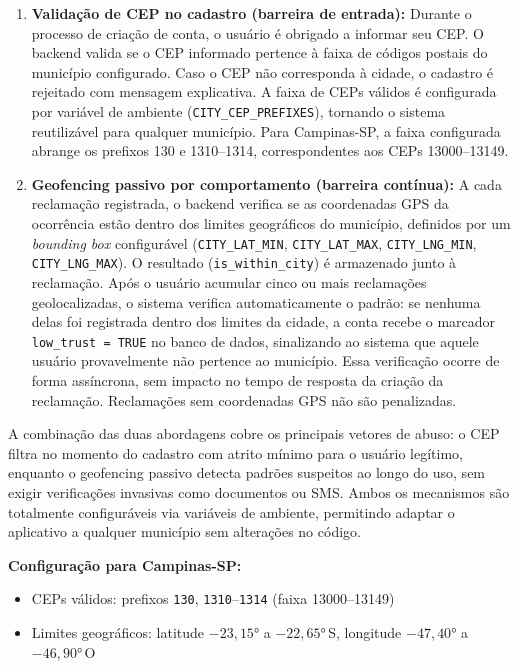 \begin{enumerate}
  \item \textbf{Validação de CEP no cadastro (barreira de entrada):}
        Durante o processo de criação de conta, o usuário é obrigado a informar
        seu CEP. O backend valida se o CEP informado pertence à faixa de códigos
        postais do município configurado. Caso o CEP não corresponda à cidade,
        o cadastro é rejeitado com mensagem explicativa. A faixa de CEPs válidos
        é configurada por variável de ambiente (\texttt{CITY\_CEP\_PREFIXES}),
        tornando o sistema reutilizável para qualquer município. Para
        Campinas-SP, a faixa configurada abrange os prefixos 130 e 1310--1314,
        correspondentes aos CEPs 13000--13149.

  \item \textbf{Geofencing passivo por comportamento (barreira contínua):}
        A cada reclamação registrada, o backend verifica se as coordenadas
        GPS da ocorrência estão dentro dos limites geográficos do município,
        definidos por um \textit{bounding box} configurável
        (\texttt{CITY\_LAT\_MIN}, \texttt{CITY\_LAT\_MAX},
        \texttt{CITY\_LNG\_MIN}, \texttt{CITY\_LNG\_MAX}). O resultado
        (\texttt{is\_within\_city}) é armazenado junto à reclamação.
        Após o usuário acumular cinco ou mais reclamações geolocalizadas,
        o sistema verifica automaticamente o padrão: se nenhuma delas foi
        registrada dentro dos limites da cidade, a conta recebe o marcador
        \texttt{low\_trust = TRUE} no banco de dados, sinalizando ao sistema
        que aquele usuário provavelmente não pertence ao município. Essa
        verificação ocorre de forma assíncrona, sem impacto no tempo de
        resposta da criação da reclamação. Reclamações sem coordenadas GPS
        não são penalizadas.
\end{enumerate}

A combinação das duas abordagens cobre os principais vetores de abuso: o CEP
filtra no momento do cadastro com atrito mínimo para o usuário legítimo, enquanto
o geofencing passivo detecta padrões suspeitos ao longo do uso, sem exigir
verificações invasivas como documentos ou SMS. Ambos os mecanismos são
totalmente configuráveis via variáveis de ambiente, permitindo adaptar o
aplicativo a qualquer município sem alterações no código.

\bigskip

\noindent\textbf{Configuração para Campinas-SP:}
\begin{itemize}
  \item CEPs válidos: prefixos \texttt{130}, \texttt{1310}--\texttt{1314}
        (faixa 13000--13149)
  \item Limites geográficos: latitude $-23{,}15°$ a $-22{,}65°$\,S,
        longitude $-47{,}40°$ a $-46{,}90°$\,O
\end{itemize}

